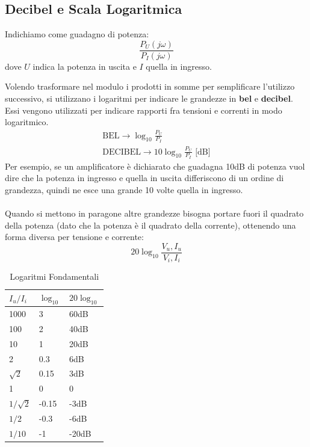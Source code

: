 \documentclass[../main.tex]{subfiles}
\begin{document}
	\subsection{Decibel e Scala Logaritmica}
	\begin{definition}
			Indichiamo come guadagno di potenza:
		\begin{equation}
			\frac{P_U (j \omega)}{P_I(j \omega)}
		\end{equation}
		dove $U$ indica la potenza in uscita e $I$ quella in ingresso.
	\end{definition}
	Volendo trasformare nel modulo i prodotti in somme per semplificare l'utilizzo successivo, si utilizzano i logaritmi per indicare le grandezze in \textbf{bel} e \textbf{decibel}.\\
	Essi vengono utilizzati per indicare rapporti fra tensioni e correnti in modo logaritmico.
	\begin{gather}
		\text{BEL}\rightarrow\log_{10}\frac{P_U}{P_I} \\
		\text{DECIBEL} \rightarrow 10\log_{10}\frac{P_U}{P_I} \text{ [dB]}
	\end{gather}
	Per esempio, se un amplificatore è dichiarato che guadagna 10dB di potenza vuol dire che la potenza in ingresso e quella in uscita differiscono di un ordine di grandezza, quindi ne esce una grande 10 volte quella in ingresso.\\\\
	Quando si mettono in paragone altre grandezze bisogna portare fuori il quadrato della potenza (dato che la potenza è il quadrato della corrente), ottenendo una forma diversa per tensione e corrente:
	\begin{equation}
		20\log_{10} \frac{V_u, I_u}{V_i, I_i}	
	\end{equation}
	\begin{table}[h]
		\centering
		\begin{tabular}{|l|l|l|}
			\hline
			$I_u / I_i$	&	$\log_{10}$	&	$20\log_{10}$ \\ \hline
			1000	&	3	&	60dB \\ 
			100		&	2	&	40dB \\ 
			10		&	1	&	20dB \\ 
			2		&	0.3	&	6dB \\
			$\sqrt{2}$	&	0.15 & 3dB \\
			1	&	0	&	0 \\
			$1/\sqrt{2}$& -0.15 & -3dB \\
			$1/2$ &	-0.3	& -6dB \\
			$1/10$ 	& -1 & -20dB \\
			\hline
		\end{tabular}
		\caption{Logaritmi Fondamentali}
		\label{log}
	\end{table}
\end{document}
